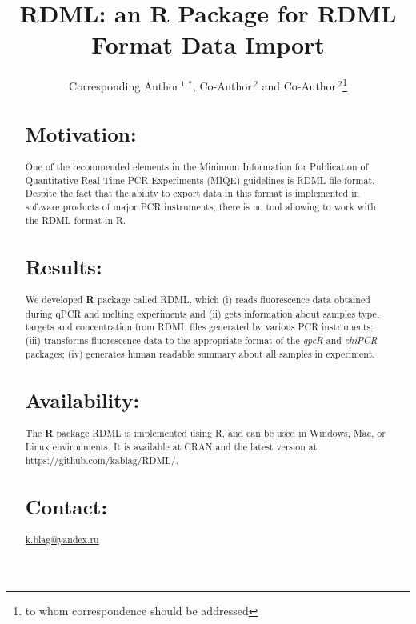\documentclass{bioinfo}
\begin{document}

\title[RDML]{RDML: an \textbf{R} Package for RDML Format Data Import}
\author[Sample \textit{et~al}]{Corresponding Author\,$^{1,*}$, Co-Author\,$^{2}$ and Co-Author\,$^2$\footnote{to whom correspondence should be addressed}}
\address{$^{1}$Department of XXXXXXX, Address XXXX etc.\\
$^{2}$Department of XXXXXXXX, Address XXXX etc.}



\maketitle

\begin{abstract}

\section{Motivation:}
One of the recommended elements in the Minimum Information for Publication of 
Quantitative Real-Time PCR Experiments (MIQE) guidelines is RDML file format. 
Despite the fact that the ability to export data in this format is implemented 
in software products of major PCR instruments, there is no tool allowing to work 
with the RDML format in R. 

\section{Results:}
We developed \textbf{R} package called RDML, which (i) reads fluorescence data obtained 
during qPCR and melting experiments and (ii) gets information about samples 
type, targets and concentration from RDML files generated by various PCR 
instruments; (iii) transforms fluorescence data to the appropriate format of the 
\textit{qpcR} and \textit{chiPCR} packages; (iv) generates human readable 
summary about all samples in experiment. 
\section{Availability:}
The \textbf{R} package RDML is implemented using R, and can be used in Windows, Mac, or 
Linux environments. It is available at CRAN and the latest version at 
https://github.com/kablag/RDML/.
\section{Contact:} \href{k.blag@yandex.ru}{k.blag@yandex.ru}
\end{abstract}
\end{document}
